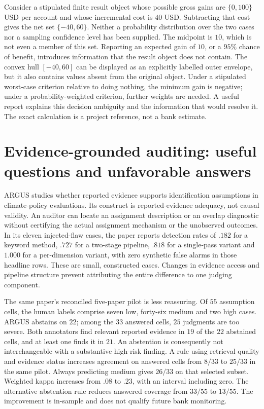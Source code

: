 Consider a stipulated finite result object whose possible gross gains are
\(\{0,100\}\) USD per account and whose incremental cost is \(40\) USD.
Subtracting that cost gives the net set \(\{-40,60\}\). Neither a probability
distribution over the two cases nor a sampling confidence level has been
supplied. The midpoint is \(10\), which is not even a member of this set.
Reporting an expected gain of \(10\), or a \(95\%\) chance of benefit, introduces
information that the result object does not contain. The convex hull
\([-40,60]\) can be displayed as an explicitly labelled outer envelope, but it
also contains values absent from the original object. Under a stipulated
worst-case criterion relative to doing nothing, the minimum gain is negative;
under a probability-weighted criterion, further weights are needed. A useful
report explains this decision ambiguity and the information that would resolve
it. The exact calculation is a project reference, not a bank estimate.
\citep{exec16_report_oracle}

\section{Evidence-grounded auditing: useful questions and unfavorable answers}

ARGUS studies whether reported evidence supports identification assumptions in
climate-policy evaluations. Its construct is reported-evidence adequacy, not
causal validity. An auditor can locate an assignment description or an overlap
diagnostic without certifying the actual assignment mechanism or the unobserved
outcomes. In its eleven injected-flaw cases, the paper reports detection rates
of \(.182\) for a keyword method, \(.727\) for a two-stage pipeline, \(.818\)
for a single-pass variant and \(1.000\) for a per-dimension variant, with zero
synthetic false alarms in those headline rows. These are small, constructed
cases. Changes in evidence access and pipeline structure prevent attributing
the entire difference to one judging component.
\citep{v12_la_2609_30867}

The same paper's reconciled five-paper pilot is less reassuring. Of \(55\)
assumption cells, the human labels comprise seven low, forty-six medium and two
high cases. ARGUS abstains on \(22\); among the \(33\) answered cells, \(25\)
judgments are too severe. Both annotators find relevant reported evidence in
\(19\) of the \(22\) abstained cells, and at least one finds it in \(21\).
An abstention is consequently not interchangeable with a substantive high-risk
finding. A rule using retrieval quality and evidence status increases agreement
on answered cells from \(8/33\) to \(25/33\) in the same pilot. Always predicting
medium gives \(26/33\) on that selected subset. Weighted kappa increases from
\(.08\) to \(.23\), with an interval including zero. The alternative abstention
rule reduces answered coverage from \(33/55\) to \(13/55\). The improvement is
in-sample and does not qualify future bank monitoring.


